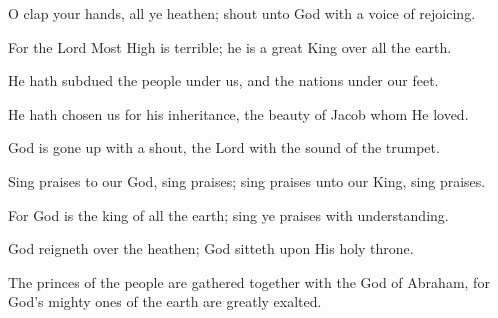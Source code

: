 O clap your hands, all ye heathen; shout unto God with a voice of rejoicing.

For the Lord Most High is terrible; he is a great King over all the earth.

He hath subdued the people under us, and the nations under our feet.

He hath chosen us for his inheritance, the beauty of Jacob whom He loved.

God is gone up with a shout, the Lord with the sound of the trumpet.

Sing praises to our God, sing praises; sing praises unto our King, sing praises.

For God is the king of all the earth; sing ye praises with understanding.

God reigneth over the heathen; God sitteth upon His holy throne.

The princes of the people are gathered together with the God of Abraham, for God's mighty ones of the earth are greatly exalted.
